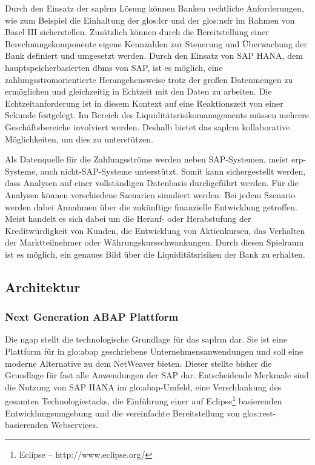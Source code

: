\begin{onehalfspacing}
Durch den Einsatz der \gls{saplrm} Lösung können Banken rechtliche Anforderungen, wie zum Beispiel die Einhaltung der \gls{glos:lcr} und der \gls{glos:nsfr} im Rahmen von Basel III sicherstellen. Zusätzlich können durch die Bereitstellung einer Berechnungskomponente eigene Kennzahlen zur Steuerung und Überwachung der Bank definiert und umgesetzt werden. Durch den Einsatz von SAP HANA, dem hauptspeicherbasierten \gls{dbms} von SAP, ist es möglich, eine zahlungsstromorientierte Herangehensweise trotz der großen Datenmengen zu ermöglichen und gleichzeitig in Echtzeit mit den Daten zu arbeiten. Die Echtzeitanforderung ist in diesem Kontext auf eine Reaktionszeit von einer Sekunde festgelegt. Im Bereich des Liquiditätsrisikomanagements müssen mehrere Geschäftsbereiche involviert werden. Deshalb bietet das \gls{saplrm} kollaborative Möglichkeiten, um dies zu unterstützen.

Als Datenquelle für die Zahlungsströme werden neben SAP-Systemen, meist \gls{erp}-Systeme, auch nicht-SAP-Systeme unterstützt. Somit kann sichergestellt werden, dass Analysen auf einer vollständigen Datenbasis durchgeführt werden. Für die Analysen können verschiedene Szenarien simuliert werden. Bei jedem Szenario werden dabei Annahmen über die zukünftige finanzielle Entwicklung getroffen. Meist handelt es sich dabei um die Herauf- oder Herabstufung der Kreditwürdigkeit von Kunden, die Entwicklung von Aktienkursen, das Verhalten der Marktteilnehmer oder Währungskursschwankungen. Durch diesen Spielraum ist es möglich, ein genaues Bild über die Liquiditätsrisiken der Bank zu erhalten.


\subsection{Architektur}

\subsubsection{Next Generation ABAP Plattform}
Die \gls{ngap} stellt die technologische Grundlage für das \gls{saplrm} dar. Sie ist eine Plattform für in \gls{glo:abap} geschriebene Unternehmensanwendungen und soll eine moderne Alternative zu dem \gls{NetWeaver} bieten. Dieser stellte bisher die Grundlage für fast alle Anwendungen der SAP dar. Entscheidende Merkmale sind die Nutzung von SAP HANA im \gls{glo:abap}-Umfeld, eine Verschlankung des gesamten Technologiestacks, die Einführung einer auf Eclipse\footnote{Eclipse -- http://www.eclipse.org/} basierenden Entwicklungsumgebung und die vereinfachte Bereitstellung von \gls{glos:rest}-basierenden Webservices.


\end{onehalfspacing}
